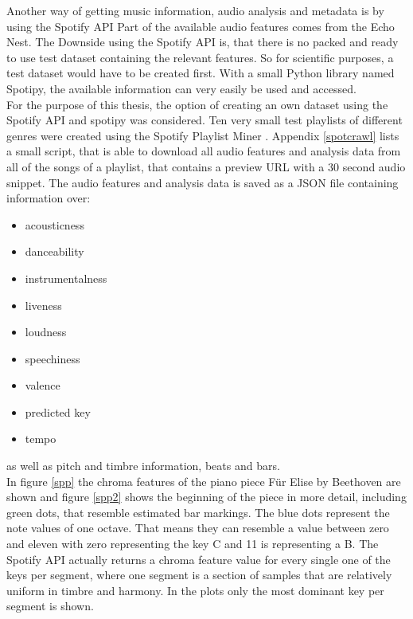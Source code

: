 Another way of getting music information, audio analysis and metadata is by using the Spotify API\cite{spotifyapi1}
Part of the available audio features comes from the Echo Nest\cite{echonest1}.
The Downside using the Spotify API is, that there is no packed and ready to use test dataset containing the relevant features. So for scientific purposes, a test dataset would have to be created first. With a small Python library named Spotipy, the available information can very easily be used and accessed. \cite{spotipy1}\\
For the purpose of this thesis, the option of creating an own dataset using the Spotify API and spotipy was considered. 
Ten very small test playlists of different genres were created using the Spotify Playlist Miner \cite{spotmin1}. 
Appendix \ref{spotcrawl} lists a small script, that is able to download all audio features and analysis data from all of the songs of a playlist, that contains a preview URL with a 30 second audio snippet. The audio features and analysis data is saved as a JSON file containing information over:
\begin{itemize}
	\setlength\itemsep{-0.5em}
	\item acousticness
	\item danceability
	\item instrumentalness
	\item liveness
	\item loudness
	\item speechiness
	\item valence
	\item predicted key
	\item tempo 
\end{itemize}
as well as pitch and timbre information, beats and bars.\\
In figure \ref{spp} the chroma features of the piano piece Für Elise by Beethoven are shown and figure \ref{spp2} shows the beginning of the piece in more detail, including green dots, that resemble estimated bar markings. The blue dots represent the note values of one octave. That means they can resemble a value between zero and eleven with zero representing the key C and 11 is representing a B. The Spotify API actually returns a chroma feature value for every single one of the keys per segment, where one segment is a section of samples that are relatively uniform in timbre and harmony. In the plots only the most dominant key per segment is shown. 
